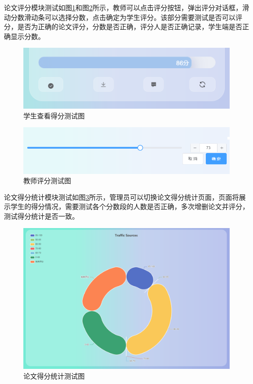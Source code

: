 论文评分模块测试如图\ref{score-student}和图\ref{score-teacher}所示，教师可以点击评分按钮，弹出评分对话框，滑动分数滑动条可以选择分数，点击确定为学生评分。该部分需要测试是否可以评分，是否为正确的论文评分，分数是否正确，评分人是否正确记录，学生端是否正确显示分数。

\begin{figure}[htbp]
  \centering
  \includegraphics[scale = 0.6]{out/figure/测试/score-student.png}
  \caption{\song\wuhao 学生查看得分测试图}
  \label{score-student}
\end{figure}

\begin{figure}[htbp]
  \centering
  \includegraphics[scale = 0.6]{out/figure/测试/score-teacher.png}
  \caption{\song\wuhao 教师评分测试图}
  \label{score-teacher}
\end{figure}

论文得分统计模块测试如图\ref{statistic-score-student-test}所示，管理员可以切换论文得分统计页面，页面将展示学生的得分情况，需要测试各个分数段的人数是否正确，多次增删论文并评分，测试得分统计是否一致。

\begin{figure}[htbp]
  \centering
  \includegraphics[scale = 0.48]{out/figure/测试/statistic-score-student-test.png}
  \caption{\song\wuhao 论文得分统计测试图}
  \label{statistic-score-student-test}
\end{figure}

